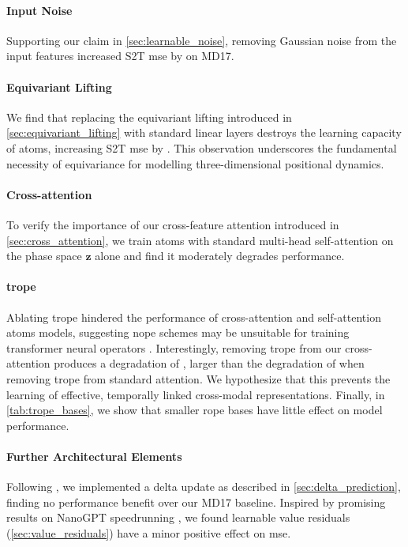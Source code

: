 \paragraph{Input Noise}
Supporting our claim in \cref{sec:learnable_noise}, removing Gaussian noise from the input features increased S2T \gls{mse} by \NoNoisevsDefault{} on MD17.

\paragraph{Equivariant Lifting} We find that replacing the equivariant lifting introduced in \cref{sec:equivariant_lifting} with standard linear layers destroys the learning capacity of \gls{atoms}, increasing S2T \gls{mse} by \NoEquivariantLiftingvsDefault{}. This observation underscores the fundamental necessity of equivariance for modelling three-dimensional positional dynamics.

\paragraph{Cross-attention} To verify the importance of our cross-feature attention introduced in \cref{sec:cross_attention}, we train \gls{atoms} with standard multi-head self-attention on the phase space \(\mathbf{z}\) alone and find it moderately degrades performance.

\paragraph{\gls{trope}} 
Ablating \gls{trope} hindered the performance of cross-attention and self-attention \gls{atoms} models, suggesting \gls{nope} schemes may be unsuitable for training transformer neural operators \cite{kazemnejad_impact_2023}. 
Interestingly, removing \gls{trope} from our cross-attention produces a degradation of \CrossAttNoPEvsDefault{}, larger than the degradation of \StdAttNoPEvsDefault{} when removing \gls{trope} from standard attention. We hypothesize that this prevents the learning of effective, temporally linked cross-modal representations. Finally, in \cref{tab:trope_bases}, we show that smaller \gls{rope} bases have little effect on model performance.

\paragraph{Further Architectural Elements}
Following \cite{garcia_satorras_en_2021}, we implemented a delta update as described in \cref{sec:delta_prediction}, finding no performance benefit over our MD17 baseline. Inspired by promising results on NanoGPT speedrunning \cite{jordan_nanogpt_2024}, we found learnable value residuals (\cref{sec:value_residuals}) \cite{zhou_value_2024} have a minor positive effect on \gls{mse}. 

